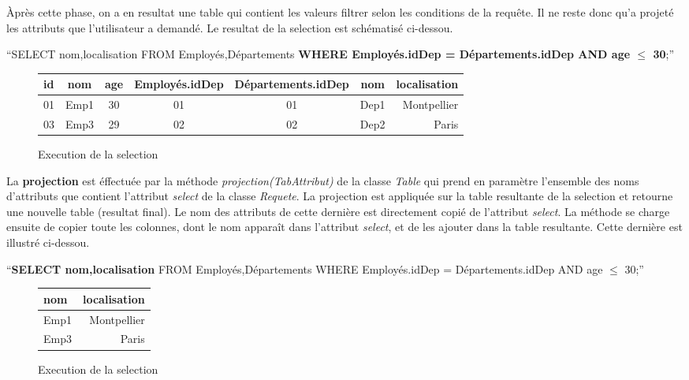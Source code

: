 \documentclass[oneside,13pt,a4paper]{report}
\begin{document}
Àprès cette phase, on a en resultat une table qui contient les valeurs filtrer selon les conditions de la requête. Il ne reste donc qu'a projeté les attributs que l'utilisateur a demandé. Le resultat de la selection est schématisé ci-dessou.
\begin{center}
	\enquote{SELECT nom,localisation FROM Employés,Départements \textbf{WHERE Employés.idDep = Départements.idDep AND age $\leq$ 30};}
	\begin{figure}[h]
		\centering
		\caption{Execution de la selection}
		\begin{tabular}{|l|c|c|c|c|c|r|}
			\hline
			id & nom  & age & Employés.idDep & Départements.idDep & nom  & localisation
			\\
			\hline
			01 & Emp1 & 30  & 01 & 01 & Dep1 & Montpellier  \\
			03 & Emp3 & 29  & 02 & 02 & Dep2 & Paris        \\
			\hline
		\end{tabular}
	\end{figure}
\end{center}

La \textbf{projection} est éffectuée par la méthode \textit{projection(TabAttribut)} de la classe \textit{Table} qui prend en paramètre l'ensemble des noms d'attributs que contient l'attribut \textit{select} de la classe \textit{Requete}. La projection est appliquée sur la table resultante de la selection et retourne une nouvelle table (resultat final). Le nom des attributs de cette dernière est directement copié de l'attribut \textit{select}. La méthode se charge ensuite de copier toute les colonnes, dont le nom apparaît dans l'attribut \textit{select}, et de les ajouter dans la table resultante. Cette dernière est illustré ci-dessou.
\begin{center}
	\enquote{\textbf{SELECT nom,localisation} FROM Employés,Départements WHERE Employés.idDep = Départements.idDep AND age $\leq$ 30;}
	\begin{figure}[h]
		\centering
		\caption{Execution de la selection}
		\begin{tabular}{|l|r|}
			\hline
			nom  & localisation
			\\
			\hline
			Emp1 & Montpellier  \\
			Emp3 & Paris        \\
			\hline
		\end{tabular}
	\end{figure}
\end{center}
\end{document}
